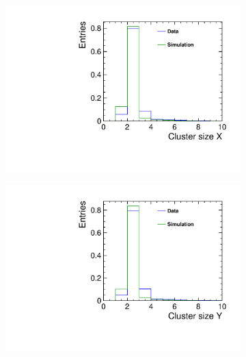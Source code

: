 \begin{figure}[htbp] \centering
  \begin{subfigure}[b]{0.3\textwidth}
    \includegraphics[width=\textwidth]{figures/Telescope/biasedResiduals/clusterSizeX_telescope0_data_simu.pdf}
    \caption{}
  \end{subfigure}\hfill
  \begin{subfigure}[b]{0.3\textwidth}
    \includegraphics[width=\textwidth]{figures/Telescope/biasedResiduals/clusterSizeY_telescope0_data_simu.pdf}
    \caption{}
  \end{subfigure}\hfill
  \begin{subfigure}[b]{0.3\textwidth}

\end{subfigure}
\end{figure}
